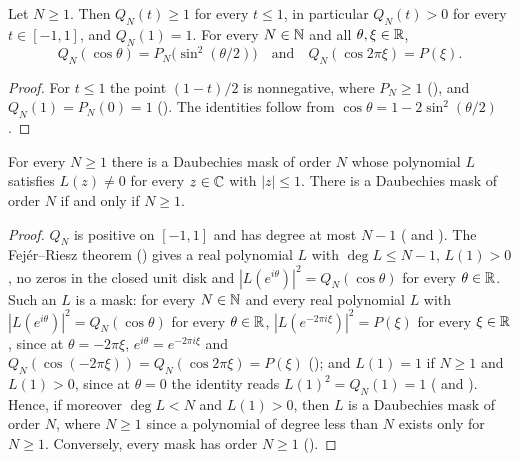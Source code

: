 \begin{lemma}[Values of $Q_N$]
\label{lem:daub-cos-poly-values}
\leanok
{}
Let $N \geq 1$. Then $Q_N(t) \geq 1$ for every $t \leq 1$, in particular $Q_N(t) > 0$ for every
$t \in [-1, 1]$, and $Q_N(1) = 1$. For every $N \in \mathbb{N}$ and all $\theta, \xi \in \mathbb{R}$,
\[
  Q_N(\cos\theta) = P_N\bigl(\sin^2(\theta/2)\bigr) \quad\text{and}\quad
  Q_N(\cos 2\pi\xi) = P(\xi) .
\]
\end{lemma}

\begin{proof}
\leanok
{}
For $t \leq 1$ the point $(1 - t)/2$ is nonnegative, where $P_N \geq 1$
(), and $Q_N(1) = P_N(0) = 1$ (). The
identities follow from $\cos\theta = 1 - 2 \sin^2(\theta/2)$.
\end{proof}

\begin{theorem}
\label{thm:daub-mask-existence}
\leanok
{}
For every $N \geq 1$ there is a Daubechies mask of order $N$ whose polynomial $L$ satisfies
$L(z) \neq 0$ for every $z \in \mathbb{C}$ with $|z| \leq 1$. There is a Daubechies mask of order $N$ if
and only if $N \geq 1$.
\end{theorem}

\begin{proof}
\leanok
{}
$Q_N$ is positive on $[-1, 1]$ and has degree at most $N - 1$
( and ). The Fej\'er--Riesz theorem
() gives a real polynomial $L$ with $\deg L \leq N - 1$, $L(1) > 0$,
no zeros in the closed unit disk and $|L(e^{i\theta})|^2 = Q_N(\cos\theta)$ for every
$\theta \in \mathbb{R}$. Such an $L$ is a mask: for every $N \in \mathbb{N}$ and every real polynomial $L$ with
$|L(e^{i\theta})|^2 = Q_N(\cos\theta)$ for every $\theta \in \mathbb{R}$,
$|L(e^{-2\pi i \xi})|^2 = P(\xi)$ for every $\xi \in \mathbb{R}$, since at $\theta = -2\pi\xi$,
$e^{i\theta} = e^{-2\pi i \xi}$ and $Q_N(\cos(-2\pi\xi)) = Q_N(\cos 2\pi\xi) = P(\xi)$
(); and $L(1) = 1$ if $N \geq 1$ and $L(1) > 0$, since at
$\theta = 0$ the identity reads $L(1)^2 = Q_N(1) = 1$
( and ). Hence, if moreover
$\deg L < N$ and $L(1) > 0$, then $L$ is a Daubechies mask of order $N$, where $N \geq 1$ since
a polynomial of degree less than $N$ exists only for $N \geq 1$. Conversely, every mask has
order $N \geq 1$ ().
\end{proof}

